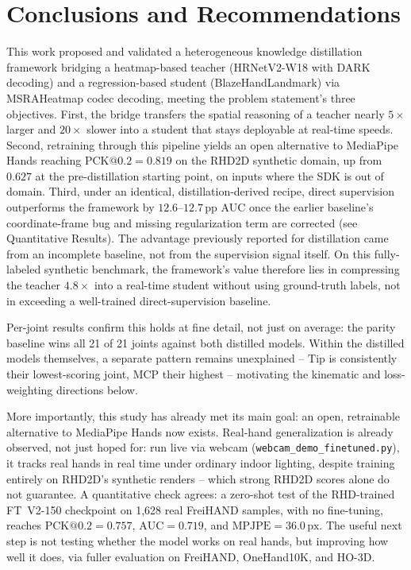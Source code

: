 \documentclass[11pt,conference,a4paper]{APSIPA2026}
\begin{document}
\section{Conclusions and Recommendations}
\label{sec:conclusion}

This work proposed and validated a heterogeneous knowledge
distillation framework bridging a heatmap-based teacher
(HRNetV2-W18 with DARK decoding) and a regression-based student
(BlazeHandLandmark) via MSRAHeatmap codec decoding, meeting the
problem statement's three objectives. First, the bridge transfers
the spatial reasoning of a teacher nearly $5\times$ larger and
$20\times$ slower into a student that stays deployable at real-time
speeds. Second, retraining through this pipeline yields an
open alternative to MediaPipe Hands reaching $\text{PCK@0.2} = 0.819$ on
the RHD2D synthetic domain, up from $0.627$ at the pre-distillation
starting point, on inputs where the SDK is out of domain. Third,
under an identical, distillation-derived recipe, direct supervision
outperforms the framework by $12.6\text{--}12.7\,\text{pp}$ AUC once the earlier
baseline's coordinate-frame bug and missing regularization term are
corrected (see Quantitative Results). The advantage previously
reported for distillation came from an incomplete baseline, not from
the supervision signal itself. On this fully-labeled synthetic
benchmark, the framework's value therefore lies in compressing the teacher $4.8\times$ into a real-time
student without using ground-truth labels, not in exceeding a
well-trained direct-supervision baseline.

Per-joint results confirm this holds at fine detail, not just on
average: the parity baseline wins all 21 of 21 joints against both
distilled models. Within the distilled models themselves, a separate
pattern remains unexplained -- Tip is consistently their
lowest-scoring joint, MCP their highest -- motivating the kinematic
and loss-weighting directions below.

More importantly, this study has already met its main goal:
an open, retrainable alternative to MediaPipe Hands now exists.
Real-hand generalization is already observed, not just hoped for:
run live via webcam (\texttt{webcam\_demo\_finetuned.py}), it tracks
real hands in real time under ordinary indoor lighting, despite
training entirely on RHD2D's synthetic renders -- which strong
RHD2D scores alone do not guarantee. A quantitative check agrees: a
zero-shot test of the RHD-trained FT~V2-150 checkpoint on 1,628 real
FreiHAND samples, with no fine-tuning, reaches $\text{PCK@0.2} = 0.757$,
$\text{AUC} = 0.719$, and $\text{MPJPE} = 36.0\,\text{px}$. The useful next step is not
testing whether the model works on real hands, but improving how
well it does, via fuller evaluation on FreiHAND, OneHand10K, and
HO-3D.
\end{document}

